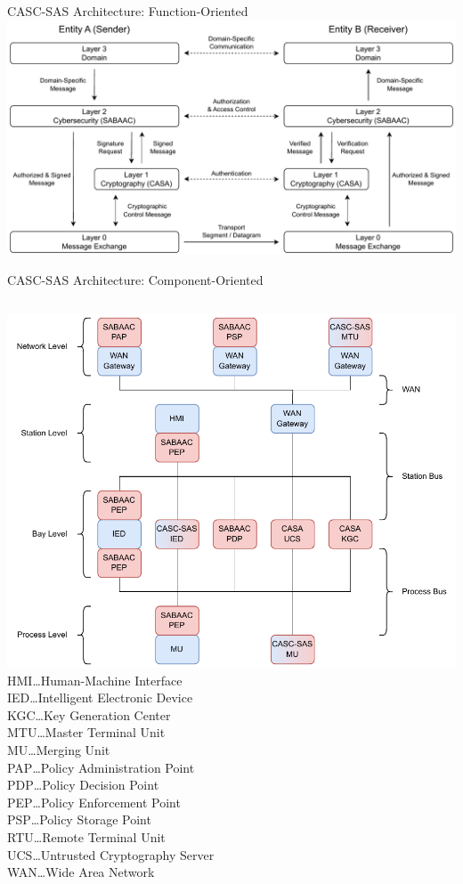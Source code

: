 \documentclass[en]{sdqbeamer}
\begin{document}
\begin{frame}{CASC-SAS Architecture: Function-Oriented}
    \centering
    \includegraphics[height=0.75\textheight]{./figures/layers_request_example.drawio.pdf}
\end{frame}
\begin{frame}{CASC-SAS Architecture: Component-Oriented}
    \begin{columns}
        \centering
        \includegraphics[height=0.75\textheight]{./figures/casc_architecture_color.drawio.pdf}
        \footnotesize
        HMI\dots Human-Machine Interface\\IED\dots Intelligent Electronic Device\\KGC\dots Key Generation Center\\MTU\dots Master Terminal Unit\\MU\dots Merging Unit\\PAP\dots Policy Administration Point\\PDP\dots Policy Decision Point\\PEP\dots Policy Enforcement Point\\PSP\dots Policy Storage Point\\RTU\dots Remote Terminal Unit\\UCS\dots Untrusted Cryptography Server\\WAN\dots Wide Area Network
    \end{columns}
\end{frame}
\end{document}
